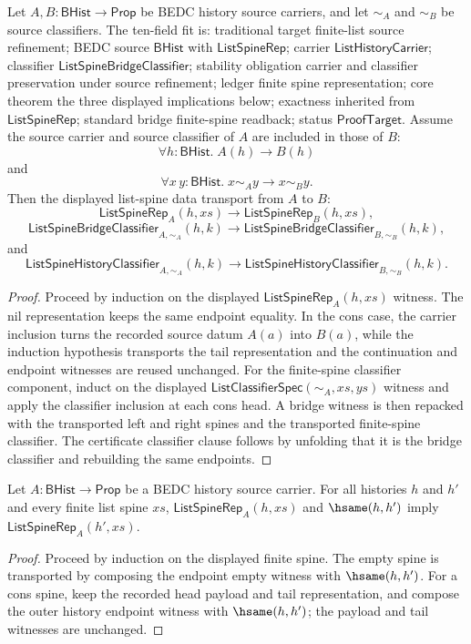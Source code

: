\begin{theorem}
\label{thm:list-spine-bridge-source-refinement}
Let $A,B:\mathsf{BHist}\to\mathsf{Prop}$ be BEDC history source carriers, and
let $\sim_A$ and $\sim_B$ be source classifiers. The ten-field fit is:
traditional target finite-list source refinement; BEDC source $\mathsf{BHist}$
with $\mathsf{ListSpineRep}$; carrier $\mathsf{ListHistoryCarrier}$; classifier
$\mathsf{ListSpineBridgeClassifier}$; stability obligation carrier and
classifier preservation under source refinement; ledger finite spine
representation; core theorem the three displayed implications below; exactness
inherited from $\mathsf{ListSpineRep}$; standard bridge finite-spine readback;
status $\mathsf{ProofTarget}$. Assume the source carrier and source classifier
of $A$ are included in those of $B$:
$$
\forall h:\mathsf{BHist}.\; A(h)\to B(h)
$$
and
$$
\forall x\,y:\mathsf{BHist}.\; x\sim_A y\to x\sim_B y.
$$
Then the displayed list-spine data transport from $A$ to $B$:
$$
\mathsf{ListSpineRep}_A(h,xs)
\to
\mathsf{ListSpineRep}_B(h,xs),
$$
$$
\mathsf{ListSpineBridgeClassifier}_{A,\sim_A}(h,k)
\to
\mathsf{ListSpineBridgeClassifier}_{B,\sim_B}(h,k),
$$
and
$$
\mathsf{ListSpineHistoryClassifier}_{A,\sim_A}(h,k)
\to
\mathsf{ListSpineHistoryClassifier}_{B,\sim_B}(h,k).
$$
\end{theorem}
\begin{proof}
Proceed by induction on the displayed $\mathsf{ListSpineRep}_A(h,xs)$ witness.
The nil representation keeps the same endpoint equality. In the cons case, the
carrier inclusion turns the recorded source datum $A(a)$ into $B(a)$, while the
induction hypothesis transports the tail representation and the continuation
and endpoint witnesses are reused unchanged. For the finite-spine classifier
component, induct on the displayed $\mathsf{ListClassifierSpec}(\sim_A,xs,ys)$
witness and apply the classifier inclusion at each cons head. A bridge witness is
then repacked with the transported left and right spines and the transported
finite-spine classifier. The certificate classifier clause follows by unfolding
that it is the bridge classifier and rebuilding the same endpoints.
\end{proof}

\begin{lemma}
\label{lem:list-spine-representation-endpoint-transport}
Let $A:\mathsf{BHist}\to\mathsf{Prop}$ be a BEDC history source carrier. For all
histories $h$ and $h'$ and every finite list spine $xs$,
$\mathsf{ListSpineRep}_A(h,xs)$ and $\hsame(h,h')$ imply
$\mathsf{ListSpineRep}_A(h',xs)$.
\end{lemma}
\begin{proof}
Proceed by induction on the displayed finite spine. The empty spine is transported
by composing the endpoint empty witness with $\hsame(h,h')$. For a cons spine,
keep the recorded head payload and tail representation, and compose the outer
history endpoint witness with $\hsame(h,h')$; the payload and tail witnesses are
unchanged.
\end{proof}

